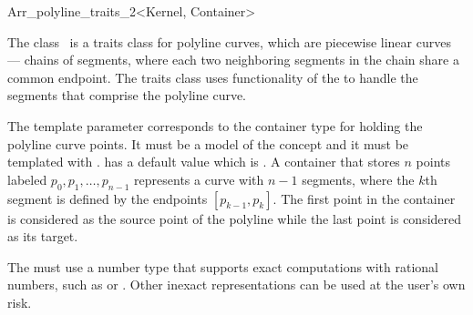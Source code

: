 
\ccRefPageBegin

\begin{ccRefClass}{Arr_polyline_traits_2<Kernel, Container>}

\ccDefinition
    The class \ccRefName\ is a traits class for polyline curves, which are
    piecewise linear curves --- chains of segments, where each two neighboring
    segments in the chain share a common endpoint. The traits class uses
    functionality of the  to handle the segments that comprise the
    polyline curve.

    The template parameter  corresponds to the container type 
    for holding the polyline curve points. It must be a model of the 
     concept and it must be templated with
    .  has a default value which is
    . A container that stores $n$ points 
    labeled $p_{0},p_{1},\ldots,p_{n-1}$ represents a curve with $n-1$ 
    segments, where the $k$th segment is defined by the endpoints
    $[p_{k-1},p_{k}]$. The first point in the container is considered as the 
    source point of the polyline while the last point is considered as its 
    target.

    The  must use a number type that supports exact computations
    with rational numbers, such as  or 
    . Other inexact representations can be used at the 
    user's own risk.


\ccIsModel
     

\end{ccRefClass}



\ccRefPageEnd
